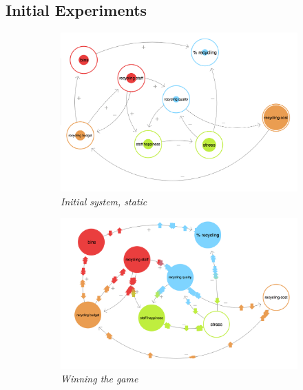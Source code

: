 \documentclass[nofonts,nols,justified,nobib]{tufte-book}
\begin{document}
\subsection*{Initial Experiments}

\begin{figure}
  \centering
  \caption{Initial Experiments with \emph{Loopy!}}
  \label{optimising}
\begin{subfigure}{.3\textwidth}
  \centering
  \includegraphics[width=1\linewidth]{img/3/loopy/small-static.png}
\caption{\textit{Initial system, static}}
\end{subfigure}
 \quad
\begin{subfigure}{.3\textwidth}
  \centering
  \includegraphics[width=1\linewidth]{img/3/loopy/small-win.png}
\caption{\textit{Winning the game}}
  \label{small:win}
\end{subfigure}%
\quad
\begin{subfigure}{.3\textwidth}

\end{subfigure}
\end{figure}
\end{document}
